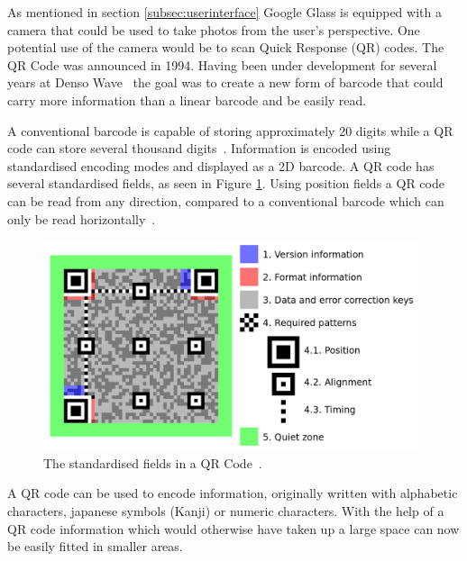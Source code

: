 As mentioned in section \ref{subsec:userinterface} Google Glass is equipped with a camera that could be used to take photos from the user's perspective. One potential use of the camera would be to scan Quick Response (QR) codes. The QR Code was announced in 1994. Having been under development for several years at Denso Wave~\cite{qrCodeHistory} the goal was to create a new form of barcode that could carry more information than a linear barcode and be easily read.

A conventional barcode is capable of storing approximately 20 digits while a QR code can store several thousand digits~\cite{qrCodeType}. Information is encoded using standardised encoding modes and displayed as a 2D barcode. A QR code has several standardised fields, as seen in Figure \ref{qrcodestandard}. Using position fields a QR code can be read from any direction, compared to a conventional barcode which can only be read horizontally~\cite{qrCodeAbout}.

	\begin{figure}[ht!]
		\centering
		\includegraphics[width=110mm]{images/qrcodestandard}
		\caption{The standardised fields in a QR Code~\cite{qrCodeWiki}.}
		\label{qrcodestandard}
	\end{figure}
	
A QR code can be used to encode information, originally written with alphabetic characters, japanese symbols (Kanji) or numeric characters.\cite{qrCodeVersion} With the help of a QR code information which would otherwise have taken up a large space can now be easily fitted in smaller areas.